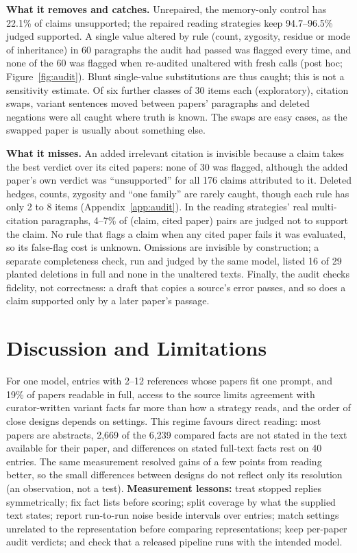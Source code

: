 \documentclass{article} %
\begin{document}
\textbf{What it removes and catches.} Unrepaired, the memory-only control has 22.1\% of claims unsupported; the repaired reading strategies keep 94.7--96.5\% judged supported. A single value altered by rule (count, zygosity, residue or mode of inheritance) in 60 paragraphs the audit had passed was flagged every time, and none of the 60 was flagged when re-audited unaltered with fresh calls (post hoc; Figure~\ref{fig:audit}). Blunt single-value substitutions are thus caught; this is not a sensitivity estimate. Of six further classes of 30 items each (exploratory), citation swaps, variant sentences moved between papers' paragraphs and deleted negations were all caught where truth is known. The swaps are easy cases, as the swapped paper is usually about something else.

\textbf{What it misses.} An added irrelevant citation is invisible because a claim takes the best verdict over its cited papers: none of 30 was flagged, although the added paper's own verdict was ``unsupported'' for all 176 claims attributed to it. Deleted hedges, counts, zygosity and ``one family'' are rarely caught, though each rule has only 2 to 8 items (Appendix~\ref{app:audit}). In the reading strategies' real multi-citation paragraphs, 4--7\% of (claim, cited paper) pairs are judged not to support the claim. No rule that flags a claim when any cited paper fails it was evaluated, so its false-flag cost is unknown. Omissions are invisible by construction; a separate completeness check, run and judged by the same model, listed 16 of 29 planted deletions in full and none in the unaltered texts. Finally, the audit checks fidelity, not correctness: a draft that copies a source's error passes, and so does a claim supported only by a later paper's passage.

\section{Discussion and Limitations}
\label{sec:discussion}
For one model, entries with 2--12 references whose papers fit one prompt, and 19\% of papers readable in full, access to the source limits agreement with curator-written variant facts far more than how a strategy reads, and the order of close designs depends on settings. This regime favours direct reading: most papers are abstracts, 2,669 of the 6,239 compared facts are not stated in the text available for their paper, and differences on stated full-text facts rest on 40 entries. The same measurement resolved gains of a few points from reading better, so the small differences between designs do not reflect only its resolution (an observation, not a test). \textbf{Measurement lessons:} treat stopped replies symmetrically; fix fact lists before scoring; split coverage by what the supplied text states; report run-to-run noise beside intervals over entries; match settings unrelated to the representation before comparing representations; keep per-paper audit verdicts; and check that a released pipeline runs with the intended model.
\end{document}
